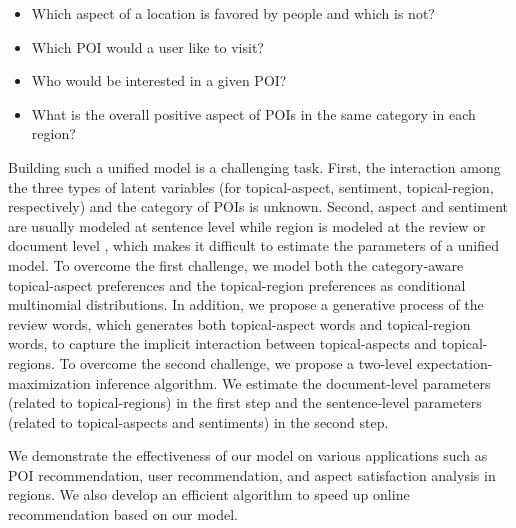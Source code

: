 \begin{itemize}
\item Which aspect of a location is favored by
people and which is not?
\item Which POI would a user like to visit?
\item Who would be interested in a given POI?
\item What is the overall positive aspect of POIs in the same
category in each region?
\end{itemize}

Building such a unified model is a challenging task. First,
the interaction among
the three types of latent variables
(for topical-aspect, sentiment, topical-region, respectively)
and the category of POIs is unknown. %
Second, aspect and sentiment are usually modeled at
sentence level \cite{JoASUM:2011}
while region is modeled at the review or document level
\cite{Hong:2012, Yin:2011}, which
makes it difficult to estimate the parameters of a unified model.
To overcome the first challenge, we model both the category-aware
topical-aspect preferences and the topical-region preferences as
conditional multinomial distributions. In addition, we propose a
generative process of the review words, which generates both
topical-aspect words and topical-region words, to capture the
implicit interaction between topical-aspects and topical-regions.
To overcome the second challenge, we propose
a two-level expectation-maximization inference algorithm.
We estimate the document-level parameters (related to topical-regions)
in the first step and the sentence-level parameters (related to
topical-aspects and sentiments) in the second step.

We demonstrate the effectiveness of our model on various applications such as POI recommendation,
user recommendation, and aspect satisfaction analysis in regions.
We also develop an efficient algorithm to speed up online
recommendation based on our model.


